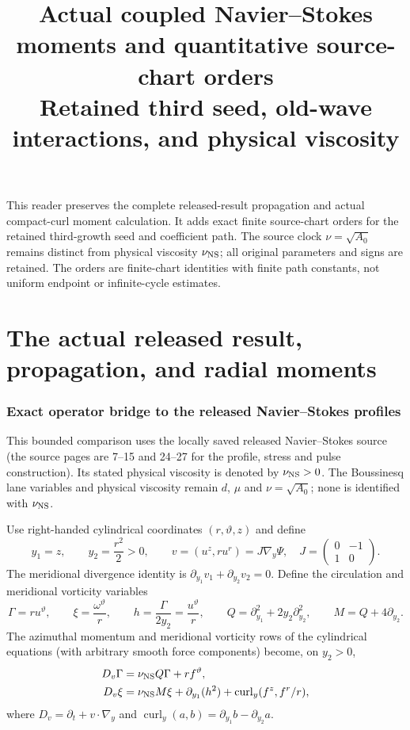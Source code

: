\documentclass[11pt]{article}
\title{Actual coupled Navier--Stokes moments and quantitative source-chart orders\\
Retained third seed, old-wave interactions, and physical viscosity}
\author{}\date{}
\begin{document}
\maketitle
This reader preserves the complete released-result propagation and actual
compact-curl moment calculation. It adds exact finite source-chart orders
for the retained third-growth seed and coefficient path. The source clock
$\nu=\sqrt{A_0}$ remains distinct from physical viscosity $\nu_{\rm NS}$;
all original parameters and signs are retained. The orders are finite-chart
identities with finite path constants, not uniform endpoint or infinite-cycle
estimates.
\tableofcontents\clearpage
\part{The actual released result, propagation, and radial moments}
\section{Exact operator bridge to the released Navier--Stokes profiles}
\label{nsbridge:nsb:operator}

This bounded comparison uses the locally saved released Navier--Stokes source
(the source pages are 7--15 and 24--27 for the profile, stress and pulse
construction). Its stated physical viscosity is denoted by $\nu_{\rm NS}>0$.
The Boussinesq lane variables and physical viscosity remain $d$, $\mu$ and
$\nu=\sqrt{A_0}$; none is identified with $\nu_{\rm NS}$.

Use right-handed cylindrical coordinates $(r,\vartheta,z)$ and define
\[
 y_1=z,\qquad y_2=\frac{r^2}{2}>0,\qquad
 v=(u^z,ru^r)=J\nabla_y\Psi,
 \quad J=\begin{pmatrix}0&-1\\1&0\end{pmatrix}.
\]
The meridional divergence identity is
$\partial_{y_1}v_1+\partial_{y_2}v_2=0$. Define the circulation and
meridional vorticity variables
\[
 \Gamma=ru^\vartheta,
 \qquad \xi=\frac{\omega^\vartheta}{r},
 \qquad h=\frac{\Gamma}{2y_2}=\frac{u^\vartheta}{r},
 \qquad Q=\partial_{y_1}^2+2y_2\partial_{y_2}^2,
 \qquad M=Q+4\partial_{y_2}.
\]
The azimuthal momentum and meridional vorticity rows of the cylindrical
equations (with arbitrary smooth force components) become, on $y_2>0$,
\begin{align}
 D_v\Gamma&=\nu_{\rm NS}Q\Gamma+r f^\vartheta,
 \label{nsbridge:nsb:Gamma}\\
 D_v\xi&=\nu_{\rm NS}M\xi+\partial_{y_1}(h^2)
       +\operatorname{curl}_y(f^z,f^r/r),
 \label{nsbridge:nsb:xi}
\end{align}
where $D_v=\partial_t+v\cdot\nabla_y$ and
$\operatorname{curl}_y(a,b)=\partial_{y_1}b-\partial_{y_2}a$.
\end{document}
